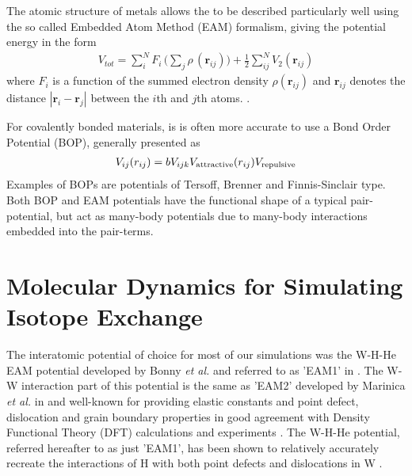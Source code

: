 The atomic structure of metals allows the to be described particularly well using the so called Embedded Atom Method (EAM) formalism, giving the potential energy in the form
\begin{align}
V_{tot} = \sum_i^N F_i\, \bigg( \sum_j \rho\, (\mathbf{r}_{ij}) \bigg) + \frac{1}{2} \sum^N_{ij} V_2 (\mathbf{r}_{ij})
\end{align}
where  $F_i$ is a function of the summed electron density $\rho (\mathbf{r}_{ij})$ and $\mathbf{r}_{ij}$ denotes the distance $| \mathbf{r}_i - \mathbf{r}_j |$ between the $i$th and $j$th atoms. \cite{EAMmodel,dudarevEAMpotential}. 

For covalently bonded materials, is is often more accurate to use a Bond Order Potential (BOP), generally presented as
\begin{align}
V_{ij}(r_{ij}) =bV_{ijk}V_{\rm attractive}(r_{ij}) V_ {\rm repulsive}
\end{align}
Examples of BOPs are potentials of Tersoff, Brenner and Finnis-Sinclair type. \cite{tersoff1988new, brenner1990empirical, finnis1984simple} Both BOP and EAM potentials have the functional shape of a typical pair-potential, but act as many-body potentials due to many-body interactions embedded into the pair-terms.


\section{Molecular Dynamics for Simulating Isotope Exchange}

The interatomic potential of choice for most of our simulations was the W-H-He EAM potential developed by Bonny \textit{et al.} and referred to as 'EAM1' in \cite{bonny2014binding}. The W-W interaction part of this potential is the same as 'EAM2' developed by Marinica \textit{et al.} in \cite{marinica2013interatomic} and well-known for providing elastic constants and point defect, dislocation and grain boundary properties in good agreement with Density Functional Theory (DFT) calculations and experiments \cite{bonny2014many}. The W-H-He potential, referred hereafter to as just 'EAM1', has been shown to relatively accurately recreate the interactions of H with both point defects and dislocations in W \cite{bonny2014binding, grigorev2015interaction}. 


